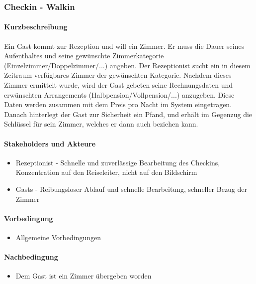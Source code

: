 \subsubsection{Checkin - Walkin}
\label{UseCase_CheckinWalkin}

\paragraph{Kurzbeschreibung}
Ein \Gls{Gast} kommt zur \Gls{Rezeption} und will ein \Gls{Zimmer}. Er muss die Dauer seines Aufenthaltes und seine gewünschte Zimmerkategorie (Einzelzimmer/Doppelzimmer/...) angeben. Der \Gls{Rezeptionist} sucht ein in diesem Zeitraum verfügbares \Gls{Zimmer} der gewünschten Kategorie. Nachdem dieses \Gls{Zimmer} ermittelt wurde, wird der \Gls{Gast} gebeten seine Rechnungsdaten und erwünschten \Gls{Arrangement}s (Halbpension/Vollpension/...) anzugeben. Diese Daten werden zusammen mit dem Preis pro Nacht im System eingetragen. Danach hinterlegt der \Gls{Gast} zur Sicherheit ein Pfand, und erhält im Gegenzug die Schlüssel für sein \Gls{Zimmer}, welches er dann auch beziehen kann.

\paragraph{Stakeholders und Akteure}
\begin{itemize}
	\item \Gls{Rezeptionist} - Schnelle und zuverlässige Bearbeitung des \Gls{Checkin}s, Konzentration auf den  \Gls{Reiseleiter}, nicht auf den Bildschirm
	\item \Glspl{Gast} - Reibungsloser Ablauf und schnelle Bearbeitung, schneller Bezug der \Gls{Zimmer}
\end{itemize}

\paragraph{Vorbedingung}
\begin{itemize}
	\item Allgemeine Vorbedingungen
\end{itemize}

\paragraph{Nachbedingung}
\begin{itemize}
	\item Dem Gast ist ein Zimmer übergeben worden
\end{itemize}

